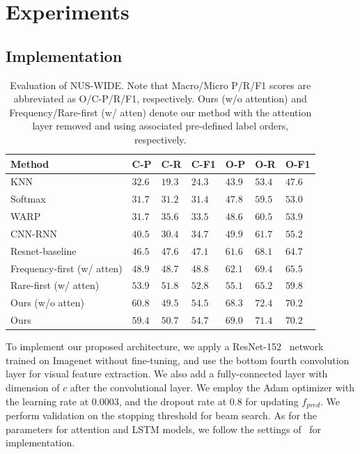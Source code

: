 \documentclass[letterpaper]{article} %
\begin{document}
\section{Experiments}
\subsection{Implementation}
\tabcolsep=1.5pt
\begin{table}[]
	\centering
		\caption{Evaluation of NUS-WIDE. Note that Macro/Micro P/R/F1 scores are abbreviated as O/C-P/R/F1, respectively. Ours (w/o attention) and Frequency/Rare-first (w/ atten) denote our method with the attention layer removed and using associated pre-defined label orders, respectively.\\}

	\begin{tabular}{l||lll|lll}
		\hline
		Method  & C-P  & C-R  & C-F1 & O-P  & O-R  & O-F1 \\ \hline
		KNN		& $32.6$ & $19.3$ & $24.3$ & $43.9$ & $53.4$ & $47.6$ \\
		Softmax & $31.7$ & $31.2$ & $31.4$ & $47.8$ & $59.5$ & $53.0$ \\
		WARP    & $31.7$ & $35.6$ & $33.5$ & $48.6$ & $60.5$ & $53.9$ \\
		CNN-RNN & $40.5$ & $30.4$ & $34.7$ & $49.9$ & $61.7$ & $55.2$ \\
        Resnet-baseline   & $46.5$ & $47.6$ & $47.1$ & $61.6$ & $68.1$ & $64.7$ \\
        Frequency-first (w/ atten)   & $48.9$ & $48.7$ & $48.8$ & $62.1$ & $69.4$ & $65.5$ \\
        Rare-first (w/ atten)   & $53.9$ & $51.8$ & $52.8$ & $55.1$ & $65.2$ & $59.8$ \\
        Ours (w/o atten)   & $60.8$ & $49.5$ & $54.5$ & $68.3$ & $72.4$ & $70.2$ \\
		Ours    & $59.4$ & $50.7$ & $\mathbf{54.7}$ & $69.0$ & $71.4$ & $\mathbf{70.2}$ \\ \hline
	\end{tabular}
	\label{table:nuswide}
\end{table}

To implement our proposed architecture, we apply a ResNet-152~\cite{he2016deep} network trained on Imagenet without fine-tuning, and use the bottom fourth convolution layer for visual feature extraction. We also add a fully-connected layer with dimension of $c$ after the convolutional layer. We employ the Adam optimizer with the learning rate at 0.0003, and the dropout rate at 0.8 for updating $f_{pred}$. We perform validation on the stopping threshold for beam search. As for the parameters for attention and LSTM models, we follow the settings of~\cite{xu2015show} for implementation.
\end{document}
